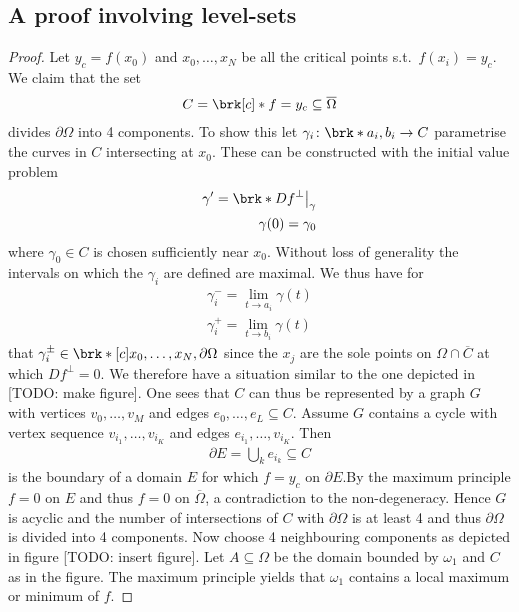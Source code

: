\subsection*{A proof involving level-sets}

\begin{proof}
  Let $y_c=f(x_0)$ and $x_0,\dots,x_N$ be all the critical points s.t.\ $f(x_i)=y_c$. We claim that the set
  \begin{align*}
    C=\brk[c]*{f=y_c}\subseteq\overline{\Omega}
  \end{align*}
  divides $\partial\Omega$ into 4 components. To show this let $\gamma_i\colon \brk*{a_i,b_i}\to C$ parametrise the curves in
  $C$ intersecting at $x_0$. These can be constructed with the initial value problem
  \begin{align*} 
    \gamma'=\brk*{Df}^\perp\big\vert_\gamma \\
    \gamma(0) = \gamma_0
  \end{align*}
  where $\gamma_0\in C$ is chosen sufficiently near $x_0$. Without loss of generality the intervals on which the $\gamma_i$ are
  defined are maximal. We thus have for
  \begin{align*}
    \gamma_i^-=\lim_{t\to a_i}\gamma(t) \\
    \gamma_i^+=\lim_{t\to b_i}\gamma(t)
  \end{align*}
  that $\gamma_i^\pm\in\brk*[c]{x_0,\dots,x_N,\partial\Omega}$ since the $x_j$ are the sole points on $\Omega\cap\overline{C}$
  at which $Df^\perp=0$. We therefore have a situation similar to the one depicted in [TODO: make figure].
  One sees that $C$ can thus be represented by a graph $G$ with vertices $v_0,\dots,v_M$ and edges $e_0,\dots,e_L\subseteq C$.
  Assume $G$ contains a cycle with vertex sequence $v_{i_1},\dots,v_{i_K}$ and edges $e_{i_1},\dots,v_{i_K}$. Then
  \begin{align*}
    \partial E = \bigcup_k e_{i_k}\subseteq C
  \end{align*}
  is the boundary of a domain $E$ for which $f=y_c$ on $\partial E$.By the maximum principle $f=0$ on $E$ and thus
  $f=0$ on $\overline{\Omega}$, a contradiction to the non-degeneracy. Hence $G$ is acyclic and the number of 
  intersections of $C$ with $\partial \Omega$ is at least 4 and thus $\partial\Omega$ is divided into 4 components.
  Now choose 4 neighbouring components as depicted in figure [TODO: insert figure]. Let $A\subseteq\Omega$ be the domain bounded
  by $\omega_1$ and $C$ as in the figure. The maximum principle yields that $\omega_1$ contains a local maximum or minimum of $f$.

\end{proof}
